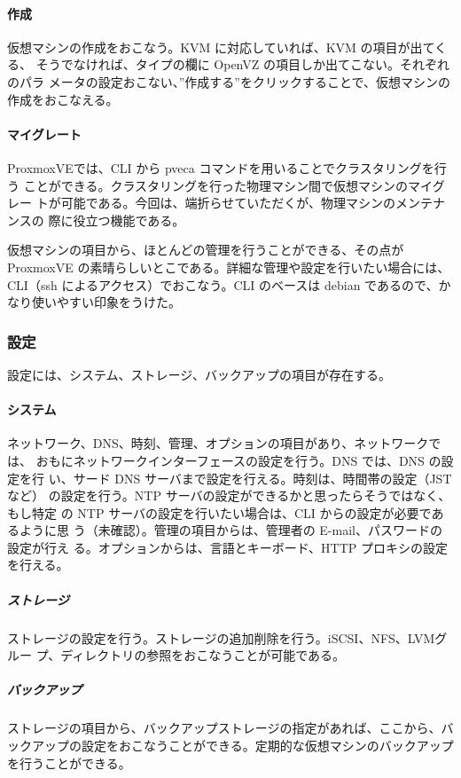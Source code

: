 \documentclass[mingoth,a4paper]{jsarticle}
\begin{document}
\paragraph{作成}
仮想マシンの作成をおこなう。KVM に対応していれば、KVM の項目が出てくる、
そうでなければ、タイプの欄に OpenVZ の項目しか出てこない。それぞれのパラ
メータの設定おこない、”作成する”をクリックすることで、仮想マシンの作成をおこなえる。

\paragraph{マイグレート}
ProxmoxVEでは、CLI から pveca コマンドを用いることでクラスタリングを行う
ことができる。クラスタリングを行った物理マシン間で仮想マシンのマイグレー
トが可能である。今回は、端折らせていただくが、物理マシンのメンテナンスの
際に役立つ機能である。

仮想マシンの項目から、ほとんどの管理を行うことができる、その点が
ProxmoxVE の素晴らしいとこである。詳細な管理や設定を行いたい場合には、
CLI（ssh によるアクセス）でおこなう。CLI のベースは debian であるので、かなり使いやすい印象をうけた。

\subsubsection{設定}
設定には、システム、ストレージ、バックアップの項目が存在する。

\paragraph{システム}
ネットワーク、DNS、時刻、管理、オプションの項目があり、ネットワークでは、
おもにネットワークインターフェースの設定を行う。DNS では、DNS の設定を行
い、サード DNS サーバまで設定を行える。時刻は、時間帯の設定（JST など）
の設定を行う。NTP サーバの設定ができるかと思ったらそうではなく、もし特定
の NTP サーバの設定を行いたい場合は、CLI からの設定が必要であるように思
う（未確認）。管理の項目からは、管理者の E-mail、パスワードの設定が行え
る。オプションからは、言語とキーボード、HTTP プロキシの設定を行える。

\subparagraph{ストレージ}
ストレージの設定を行う。ストレージの追加削除を行う。iSCSI、NFS、LVMグルー
プ、ディレクトリの参照をおこなうことが可能である。

\subparagraph{バックアップ}
ストレージの項目から、バックアップストレージの指定があれば、ここから、バックアップの設定をおこなうことができる。定期的な仮想マシンのバックアップを行うことができる。
\end{document}
